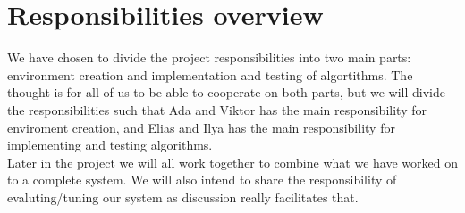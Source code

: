 \documentclass{article}
\begin{document}
\section{Responsibilities overview}
 We have chosen to divide the project responsibilities into two main parts: environment creation
 and implementation and testing of algortithms. The thought is for all of us to be able to cooperate on both parts, but we will divide
 the responsibilities such that Ada and Viktor has the main responsibility for enviroment creation, and Elias and Ilya has the main responsibility for implementing and testing algorithms.
\\
Later in the project we will all work together to combine what we have worked on to a complete system. 
We will also intend to share the responsibility of evaluting/tuning our system as discussion really
facilitates that. 


\end{document}
